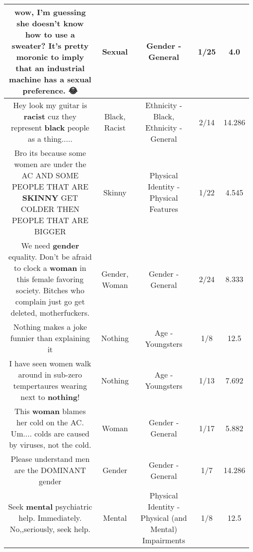 \documentclass[11pt]{article}
\newlength\mylength
\begin{document}
\begin{center}
\begin{longtable}{|C{.65\mylength}|C{.30\mylength}|C{.12\mylength}|C{.12\mylength}|C{.12\mylength}|}
  \small wow,  I'm guessing she doesn't know how to use a sweater?  It's pretty moronic to imply that an industrial machine has a \textbf{sexual} preference. 😂\normalsize   & Sexual & Gender - General & 1/25 & 4.0 \\  \hline
  \small Hey look my guitar is \textbf{racist} cuz they represent \textbf{black} people as a thing.....\normalsize   & Black, Racist & Ethnicity - Black, Ethnicity - General & 2/14 & 14.286 \\  \hline
  \small Bro its because some women are under the AC AND SOME PEOPLE THAT ARE \textbf{SKINNY} GET COLDER THEN PEOPLE THAT ARE BIGGER\normalsize   & Skinny & Physical Identity - Physical Features & 1/22 & 4.545 \\  \hline
  \small We need \textbf{gender} equality. Don't be afraid to clock a \textbf{woman} in this female favoring society. Bitches who complain just go get deleted, motherfuckers.\normalsize   & Gender, Woman & Gender - General & 2/24 & 8.333 \\  \hline
  \small Nothing makes a joke funnier than explaining it\normalsize   & Nothing & Age - Youngsters & 1/8 & 12.5 \\  \hline
  \small I have seen women walk around in sub-zero tempertaures wearing next to \textbf{nothing}!\normalsize   & Nothing & Age - Youngsters & 1/13 & 7.692 \\  \hline
  \small This \textbf{woman} blames her cold on the AC. Um.... colds are caused by viruses, not the cold.\normalsize   & Woman & Gender - General & 1/17 & 5.882 \\  \hline
  \small Please understand men are the DOMINANT gender\normalsize   & Gender & Gender - General & 1/7 & 14.286 \\  \hline
  \small Seek \textbf{mental} psychiatric help. Immediately. No,,seriously, seek help.\normalsize   & Mental & Physical Identity - Physical (and Mental) Impairments & 1/8 & 12.5 \\  \hline

\end{longtable}
\end{center}
\end{document}
